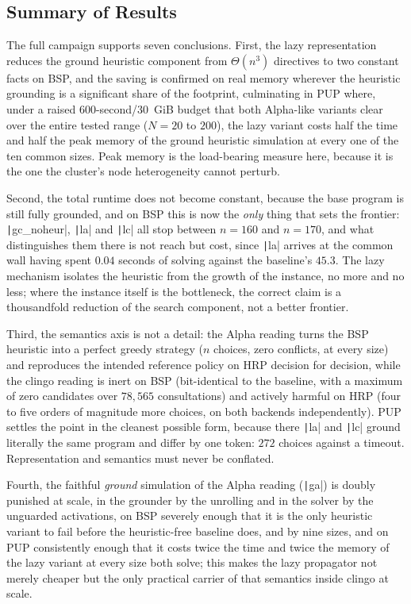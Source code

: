 \subsection{Summary of Results}

The full campaign supports seven conclusions. First, the lazy representation reduces the ground heuristic component from $\Theta(n^3)$ directives to two constant facts on BSP, and the saving is confirmed on real memory wherever the heuristic grounding is a significant share of the footprint, culminating in PUP where, under a raised 600-second/30~GiB budget that both Alpha-like variants clear over the entire tested range ($N=20$ to $200$), the lazy variant costs half the time and half the peak memory of the ground heuristic simulation at every one of the ten common sizes. Peak memory is the load-bearing measure here, because it is the one the cluster's node heterogeneity cannot perturb.

Second, the total runtime does not become constant, because the base program is still fully grounded, and on BSP this is now the \emph{only} thing that sets the frontier: \texttt|gc_noheur|, \texttt|la| and \texttt|lc| all stop between $n=160$ and $n=170$, and what distinguishes them there is not reach but cost, since \texttt|la| arrives at the common wall having spent $0.04$ seconds of solving against the baseline's $45.3$. The lazy mechanism isolates the heuristic from the growth of the instance, no more and no less; where the instance itself is the bottleneck, the correct claim is a thousandfold reduction of the search component, not a better frontier.

Third, the semantics axis is not a detail: the Alpha reading turns the BSP heuristic into a perfect greedy strategy ($n$ choices, zero conflicts, at every size) and reproduces the intended reference policy on HRP decision for decision, while the clingo reading is inert on BSP (bit-identical to the baseline, with a maximum of zero candidates over $78{,}565$ consultations) and actively harmful on HRP (four to five orders of magnitude more choices, on both backends independently). PUP settles the point in the cleanest possible form, because there \texttt|la| and \texttt|lc| ground literally the same program and differ by one token: $272$ choices against a timeout. Representation and semantics must never be conflated.

Fourth, the faithful \emph{ground} simulation of the Alpha reading (\texttt|ga|) is doubly punished at scale, in the grounder by the unrolling and in the solver by the unguarded activations, on BSP severely enough that it is the only heuristic variant to fail before the heuristic-free baseline does, and by nine sizes, and on PUP consistently enough that it costs twice the time and twice the memory of the lazy variant at every size both solve; this makes the lazy propagator not merely cheaper but the only practical carrier of that semantics inside clingo at scale.

